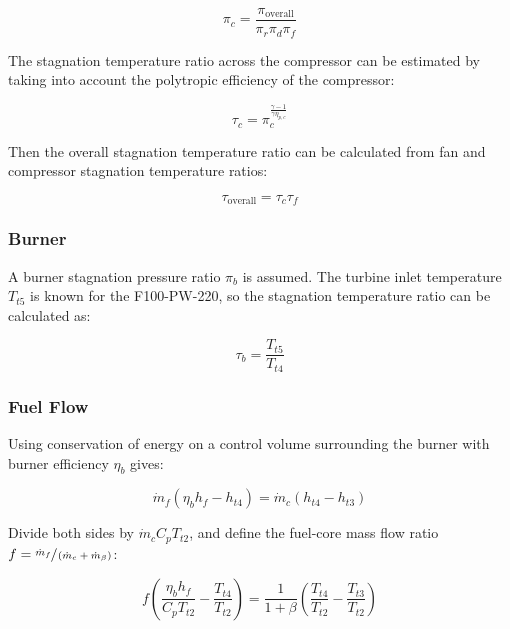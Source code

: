 \documentclass{article}
\begin{document}
\begin{equation*}
\pi_c = \frac{\pi_{\textrm{overall}}}{\pi_r \pi_d \pi_f}
\end{equation*}

The stagnation temperature ratio across the compressor can be estimated by taking into account the polytropic efficiency of the compressor:

\begin{equation*}
\tau_c = \pi_c^{\frac{\gamma-1}{\gamma \eta_{p,c}}}
\end{equation*}

Then the overall stagnation temperature ratio can be calculated from fan and compressor stagnation temperature ratios:

\begin{equation*}
\tau_{\textrm{overall}} = \tau_c \tau_f
\end{equation*}

\subsubsection{Burner}
A burner stagnation pressure ratio $\pi_b$ is assumed. The turbine inlet temperature $T_{t5}$ is known for the F100-PW-220, so the stagnation temperature ratio can be calculated as:

\begin{equation*}
\tau_b = \frac{T_{t5}}{T_{t4}}
\end{equation*}

\subsubsection{Fuel Flow}

Using conservation of energy on a control volume surrounding the burner with burner efficiency $\eta_b$ gives:

\begin{equation*}
\dot{m}_f (\eta_b h_f - h_{t4}) = \dot{m}_c ( h_{t4} - h_{t3})
\end{equation*}

Divide both sides by $\dot{m}_c C_p T_{t2}$, and define the fuel-core mass flow ratio $f = \sfrac{\dot{m}_f}{\left( \dot{m}_c + \dot{m}_{\beta} \right)}$:

\begin{equation*}
f \left( \frac{\eta_b h_f}{C_p T_{t2}} - \frac{T_{t4}}{T_{t2}} \right) = \frac{1}{1 + \beta} \left( \frac{T_{t4}}{T_{t2}} - \frac{T_{t3}}{T_{t2}} \right)
\end{equation*}
\end{document}
